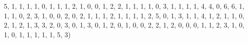 \documentclass[
]{book}
\newenvironment{Shaded}{\begin{snugshade}}{\end{snugshade}}
\newcommand{\DecValTok}[1]{\textcolor[rgb]{0.00,0.00,0.81}{#1}}
\newcommand{\NormalTok}[1]{#1}
\theoremstyle{definition}
\theoremstyle{definition}
\theoremstyle{definition}
\theoremstyle{definition}
\theoremstyle{remark}
\begin{document}
\begin{Shaded}
\begin{Highlighting}[]
\DecValTok{5}\NormalTok{, }\DecValTok{1}\NormalTok{, }\DecValTok{1}\NormalTok{, }\DecValTok{1}\NormalTok{, }\DecValTok{1}\NormalTok{, }\DecValTok{0}\NormalTok{, }\DecValTok{1}\NormalTok{, }\DecValTok{1}\NormalTok{, }\DecValTok{1}\NormalTok{, }\DecValTok{2}\NormalTok{, }\DecValTok{1}\NormalTok{, }\DecValTok{0}\NormalTok{, }\DecValTok{0}\NormalTok{, }\DecValTok{1}\NormalTok{, }\DecValTok{2}\NormalTok{, }\DecValTok{2}\NormalTok{, }
\DecValTok{1}\NormalTok{, }\DecValTok{1}\NormalTok{, }\DecValTok{1}\NormalTok{, }\DecValTok{1}\NormalTok{, }\DecValTok{0}\NormalTok{, }\DecValTok{3}\NormalTok{, }\DecValTok{1}\NormalTok{, }\DecValTok{1}\NormalTok{, }\DecValTok{1}\NormalTok{, }\DecValTok{1}\NormalTok{, }\DecValTok{4}\NormalTok{, }\DecValTok{4}\NormalTok{, }\DecValTok{0}\NormalTok{, }\DecValTok{6}\NormalTok{, }\DecValTok{6}\NormalTok{, }\DecValTok{1}\NormalTok{, }
\DecValTok{1}\NormalTok{, }\DecValTok{1}\NormalTok{, }\DecValTok{0}\NormalTok{, }\DecValTok{2}\NormalTok{, }\DecValTok{3}\NormalTok{, }\DecValTok{1}\NormalTok{, }\DecValTok{0}\NormalTok{, }\DecValTok{0}\NormalTok{, }\DecValTok{2}\NormalTok{, }\DecValTok{0}\NormalTok{, }\DecValTok{2}\NormalTok{, }\DecValTok{1}\NormalTok{, }\DecValTok{1}\NormalTok{, }\DecValTok{1}\NormalTok{, }\DecValTok{2}\NormalTok{, }\DecValTok{1}\NormalTok{, }
\DecValTok{1}\NormalTok{, }\DecValTok{1}\NormalTok{, }\DecValTok{1}\NormalTok{, }\DecValTok{2}\NormalTok{, }\DecValTok{5}\NormalTok{, }\DecValTok{0}\NormalTok{, }\DecValTok{1}\NormalTok{, }\DecValTok{3}\NormalTok{, }\DecValTok{1}\NormalTok{, }\DecValTok{1}\NormalTok{, }\DecValTok{4}\NormalTok{, }\DecValTok{1}\NormalTok{, }\DecValTok{2}\NormalTok{, }\DecValTok{1}\NormalTok{, }\DecValTok{1}\NormalTok{, }\DecValTok{0}\NormalTok{, }
\DecValTok{2}\NormalTok{, }\DecValTok{1}\NormalTok{, }\DecValTok{2}\NormalTok{, }\DecValTok{1}\NormalTok{, }\DecValTok{3}\NormalTok{, }\DecValTok{3}\NormalTok{, }\DecValTok{2}\NormalTok{, }\DecValTok{0}\NormalTok{, }\DecValTok{3}\NormalTok{, }\DecValTok{0}\NormalTok{, }\DecValTok{1}\NormalTok{, }\DecValTok{3}\NormalTok{, }\DecValTok{0}\NormalTok{, }\DecValTok{1}\NormalTok{, }\DecValTok{2}\NormalTok{, }\DecValTok{0}\NormalTok{, }
\DecValTok{1}\NormalTok{, }\DecValTok{0}\NormalTok{, }\DecValTok{0}\NormalTok{, }\DecValTok{2}\NormalTok{, }\DecValTok{2}\NormalTok{, }\DecValTok{1}\NormalTok{, }\DecValTok{2}\NormalTok{, }\DecValTok{0}\NormalTok{, }\DecValTok{0}\NormalTok{, }\DecValTok{0}\NormalTok{, }\DecValTok{1}\NormalTok{, }\DecValTok{1}\NormalTok{, }\DecValTok{2}\NormalTok{, }\DecValTok{3}\NormalTok{, }\DecValTok{1}\NormalTok{, }\DecValTok{0}\NormalTok{, }
\DecValTok{1}\NormalTok{, }\DecValTok{0}\NormalTok{, }\DecValTok{1}\NormalTok{, }\DecValTok{1}\NormalTok{, }\DecValTok{1}\NormalTok{, }\DecValTok{1}\NormalTok{, }\DecValTok{1}\NormalTok{, }\DecValTok{5}\NormalTok{, }\DecValTok{3}\NormalTok{)}

\end{Highlighting}
\end{Shaded}
\end{document}
